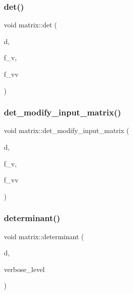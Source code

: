 \mbox{\label{classmatrix_a364b1e3b29af6f6bd952448718d79467}} 
\subsubsection{\texorpdfstring{det()}{det()}}
{\footnotesize\ttfamily void matrix\+::det (\begin{DoxyParamCaption}\item[{\mbox{\hyperlink{classdiscreta__base}{discreta\+\_\+base}} \&}]{d,  }\item[{\mbox{\hyperlink{galois_8h_a09fddde158a3a20bd2dcadb609de11dc}{I\+NT}}}]{f\+\_\+v,  }\item[{\mbox{\hyperlink{galois_8h_a09fddde158a3a20bd2dcadb609de11dc}{I\+NT}}}]{f\+\_\+vv }\end{DoxyParamCaption})}

\mbox{\label{classmatrix_a94ca76d8c4919c9f1f20c362840aaf43}} 
\subsubsection{\texorpdfstring{det\+\_\+modify\+\_\+input\+\_\+matrix()}{det\_modify\_input\_matrix()}}
{\footnotesize\ttfamily void matrix\+::det\+\_\+modify\+\_\+input\+\_\+matrix (\begin{DoxyParamCaption}\item[{\mbox{\hyperlink{classdiscreta__base}{discreta\+\_\+base}} \&}]{d,  }\item[{\mbox{\hyperlink{galois_8h_a09fddde158a3a20bd2dcadb609de11dc}{I\+NT}}}]{f\+\_\+v,  }\item[{\mbox{\hyperlink{galois_8h_a09fddde158a3a20bd2dcadb609de11dc}{I\+NT}}}]{f\+\_\+vv }\end{DoxyParamCaption})}

\mbox{\label{classmatrix_a75adb25c9f8753f1b81eafe4464b272a}} 
\subsubsection{\texorpdfstring{determinant()}{determinant()}}
{\footnotesize\ttfamily void matrix\+::determinant (\begin{DoxyParamCaption}\item[{\mbox{\hyperlink{classdiscreta__base}{discreta\+\_\+base}} \&}]{d,  }\item[{\mbox{\hyperlink{galois_8h_a09fddde158a3a20bd2dcadb609de11dc}{I\+NT}}}]{verbose\+\_\+level }\end{DoxyParamCaption})}

